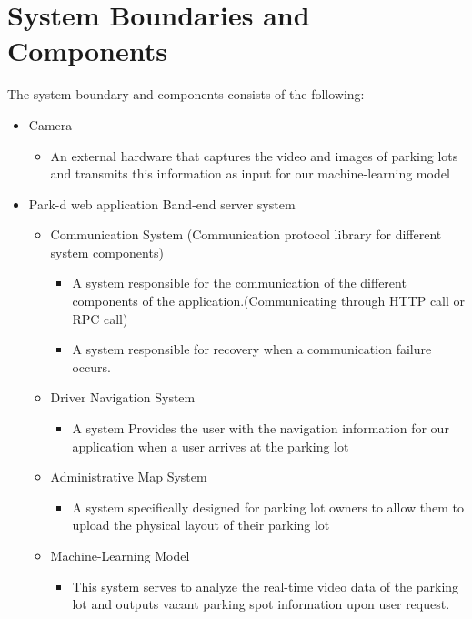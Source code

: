 \documentclass[12pt,letterpaper]{article}
\begin{document}
\section{System Boundaries and Components}
The system boundary and components consists of the following:
\begin{itemize}
    \item Camera
    \begin{itemize}
        \item An external hardware that captures the video and images of parking
        lots and transmits this information as input for our machine-learning
        model
    \end{itemize}
    \item Park-d web application Band-end server system
    \begin{itemize}
        \item Communication System (Communication protocol library for different
        system components)
        \begin{itemize}
            \item A system responsible for the communication of the different
            components of the application.(Communicating through HTTP call or
            RPC call)
            \item A system responsible for recovery when a communication failure
            occurs.
    \end{itemize}
    \item Driver Navigation System
    \begin{itemize}
        \item A system Provides the user with the navigation information for our
        application when a user arrives at the parking lot
    \end{itemize}
    \item Administrative Map System
    \begin{itemize}
        \item A system specifically designed for parking lot owners to allow
        them to upload the physical layout of their parking lot
    \end{itemize}
    \item Machine-Learning Model
    \begin{itemize}
        \item This system serves to analyze the real-time video data of the
        parking lot and outputs vacant parking spot information upon user
        request.
    \end{itemize}

\end{itemize}
\end{itemize}
\end{document}
